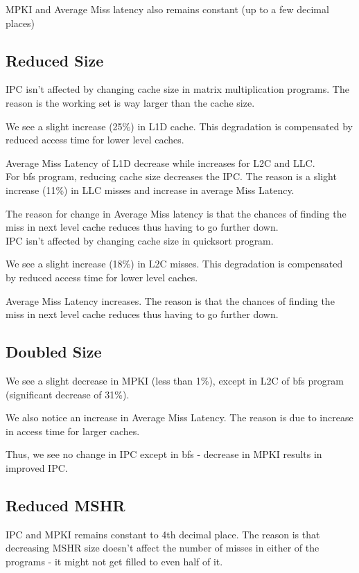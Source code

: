 \documentclass[11pt, swedish, openany]{book}
\begin{document}
MPKI and Average Miss latency also remains constant (up to a few decimal places)

\subsection{Reduced Size}
IPC isn't affected by changing cache size in matrix multiplication programs. The reason is the working set is way larger than the cache size.

We see a slight increase (25\%) in L1D cache. This degradation is compensated by reduced access time for lower level caches.

Average Miss Latency of L1D decrease while increases for L2C and LLC. \\

For bfs program, reducing cache size decreases the IPC. The reason is a slight increase (11\%) in LLC misses and increase in average Miss Latency.

The reason for change in Average Miss latency is that the chances of finding the miss in next level cache reduces thus having to go further down. \\

IPC isn't affected by changing cache size in quicksort program.

We see a slight increase (18\%) in L2C misses. This degradation is compensated by reduced access time for lower level caches.

Average Miss Latency increases. The reason is that the chances of finding the miss in next level cache reduces thus having to go further down.

\subsection{Doubled Size}
We see a slight decrease in MPKI (less than 1\%), except in L2C of bfs program (significant decrease of 31\%).

We also notice an increase in Average Miss Latency. The reason is due to increase in access time for larger caches.

Thus, we see no change in IPC except in bfs - decrease in MPKI results in improved IPC.

\subsection{Reduced MSHR}
IPC and MPKI remains constant to 4th decimal place. The reason is that decreasing MSHR size doesn't affect the number of misses in either of the programs - it might not get filled to even half of it.
\end{document}
